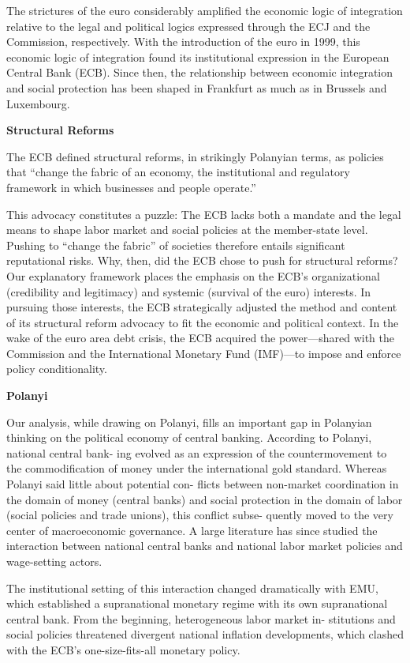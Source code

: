 \documentclass[
]{book}
\begin{document}
The strictures of the euro considerably amplified the economic
logic of integration relative to the legal and political logics
expressed through the ECJ and the Commission, respectively.
With the introduction of the euro in 1999, this economic
logic of integration found its institutional expression in
the European Central Bank (ECB).
Since then, the relationship between economic integration and
social protection has been shaped in Frankfurt as much as in Brussels and Luxembourg.

\textbf{Structural Reforms}

The ECB defined structural reforms, in strikingly Polanyian terms, as policies
that ``change the fabric of an economy, the institutional and regulatory framework in
which businesses and people operate.''

This advocacy constitutes a puzzle:
The ECB lacks both a mandate and the legal means to
shape labor market and social policies
at the member-state level.
Pushing to ``change the fabric'' of societies therefore entails significant
reputational risks.
Why, then, did the ECB chose to push for structural reforms?
Our explanatory framework places the emphasis on
the ECB's organizational (credibility and legitimacy) and
systemic (survival of the euro) interests.
In pursuing those interests, the ECB strategically adjusted the method and content of
its structural reform advocacy to fit the economic and political context.
In the wake of the euro area debt crisis, the
ECB acquired the power---shared with the Commission and the International Monetary
Fund (IMF)---to impose and enforce policy conditionality.

\textbf{Polanyi}

Our analysis, while drawing on Polanyi, fills an important gap in Polanyian thinking
on the political economy of central banking. According to Polanyi, national central bank-
ing evolved as an expression of the countermovement to the commodification of money
under the international gold standard. Whereas Polanyi said little about potential con-
flicts between non-market coordination in the domain of money (central banks) and social
protection in the domain of labor (social policies and trade unions), this conflict subse-
quently moved to the very center of macroeconomic governance.
A large literature has
since studied the interaction between national central banks and national labor market
policies and wage-setting actors.

The institutional setting of this interaction
changed dramatically with EMU, which established a supranational monetary regime with
its own supranational central bank. From the beginning, heterogeneous labor market in-
stitutions and social policies threatened divergent national inflation developments, which
clashed with the ECB's one-size-fits-all monetary policy.
\end{document}

